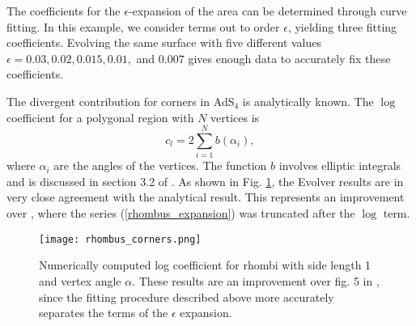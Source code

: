 \documentclass[11 pt]{article}
\begin{document}
The coefficients for the $\epsilon$-expansion of the area can be determined through curve fitting. In this example, we consider terms out to order $\epsilon$, yielding three fitting coefficients. Evolving the same surface with five different values $\epsilon=0.03,0.02,0.015,0.01,$ and $0.007$ gives enough data to accurately fix these coefficients.

The divergent contribution for corners in AdS$_4$ is analytically known. The $\log$ coefficient for a polygonal region with $N$ vertices is
\begin{equation}
    c_l = 2\sum_{i=1}^N b(\alpha_i),
\end{equation}
where $\alpha_i$ are the angles of the vertices. The function $b$ involves elliptic integrals and is discussed in section 3.2 of \cite{Fonda2015}. As shown in Fig. \ref{fig:rhombus_corners}, the Evolver results are in very close agreement with the analytical result. This represents an improvement over \cite{Fonda2015}, where the series (\ref{rhombus_expansion}) was truncated after the $\log$ term.

\begin{figure}[h!]
    \centering
    \texttt{[image: rhombus\_corners.png]}
    \caption{Numerically computed log coefficient for rhombi with side length 1 and vertex angle $\alpha$. These results are an improvement over fig. 5 in \cite{Fonda2015}, since the fitting procedure described above more accurately separates the terms of the $\epsilon$ expansion.}
    \label{fig:rhombus_corners}
\end{figure}
\end{document}
